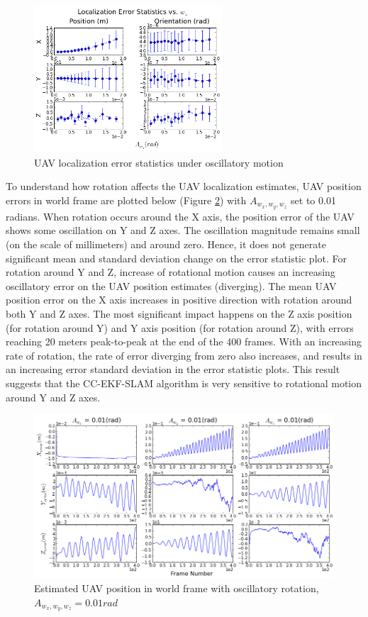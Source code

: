 \begin{figure}[h]
  \includegraphics[width=7cm, keepaspectratio=true]{./Figures/SimulationFigures/Figure13.png}
  \caption{UAV localization error statistics under oscillatory motion} 
  \label{fig:simfig9-10}
\end{figure}
\FloatBarrier

To understand how rotation affects the UAV localization estimates,
UAV position errors in world frame are plotted below (Figure
\ref{fig:simfig14}) with $A_{w_x,w_y,w_z}$ set to
0.01 radians. When rotation occurs around the X axis, the position error of
the UAV shows some oscillation on Y and Z axes. The oscillation
magnitude remains small (on the scale of millimeters) and around
zero. Hence, it does not generate significant mean and standard deviation
change on the error statistic plot. For rotation around Y and Z, increase
of rotational motion causes an increasing oscillatory error on the UAV
position estimates (diverging). The mean UAV position error on the X axis
increases in positive direction with rotation around both Y and Z
axes. The most significant impact happens on the Z axis position (for
rotation around Y) and Y axis position (for rotation around Z), with errors
reaching 20 meters peak-to-peak at the end of the 400 frames. With an
increasing rate of rotation, the rate of
error diverging from zero also increases, and results in an
increasing error standard deviation in the error statistic plots. This
result suggests that the CC-EKF-SLAM algorithm is very
sensitive to rotational motion around Y and Z axes.

\begin{figure}[h]
  \centering
  \includegraphics[width=13cm, keepaspectratio=true]{./Figures/SimulationFigures/Figure14.png}
  \caption{Estimated UAV position in world frame with oscillatory
    rotation, $A_{w_x,w_y,w_z} = 0.01 rad$}
  \label{fig:simfig14}
\end{figure}
\FloatBarrier

